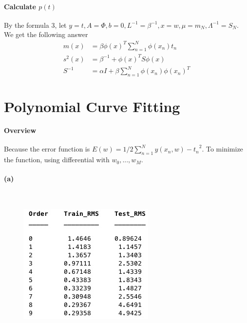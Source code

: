 \documentclass[]{article}
\begin{document}
	\paragraph{Calculate $ p(t) $}
	By the formula 3,  let $y = t, A = \Phi, b = 0, L^{-1} = \beta^{-1}, x = w, \mu = m_{N}, \Lambda^{-1} = S_{N}$. We get the following answer
	\begin{align*}
	m(x) &= \beta\phi(x)^{T}\sum\limits_{n=1}^N\phi(x_{n})t_{n}\\
	s^{2}(x) &= \beta^{-1} + \phi(x)^{T}S\phi(x)\\
	S^{-1} &= \alpha I + \beta\sum\limits_{n=1}^N\phi(x_{n})\phi(x_{n})^{T}
	\end{align*}        
	\section{Polynomial Curve Fitting}
	\paragraph{Overview} Because the error function is $E(w) = 1 / 2 \sum_{n = 1}^{N} {y(x_{n}, w) - t_{n}}^{2}$. To minimize the function, using differential with $w_{0}, ..., w_{M}$.
	\paragraph{(a)}\mbox{}\\
	
	\begin{figure}[H]
		\centering
		\includegraphics[width=0.8\linewidth]{2a1}
		\caption{}
		\label{fig:2a1}
	\end{figure}
	
\end{document}
